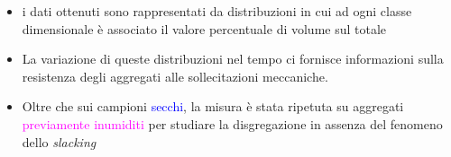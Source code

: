 \documentclass[10pt]{beamer}
\begin{document}
\begin{frame}

  \begin{minipage}[ht]{\textwidth}
    \footnotesize
    \begin{itemize}[<+->]
    \item i dati ottenuti sono rappresentati da distribuzioni in cui ad
      ogni classe dimensionale \`e associato il valore percentuale di
      volume sul totale
      \pause
    \item La variazione di queste distribuzioni nel tempo ci fornisce
      informazioni sulla resistenza degli aggregati alle sollecitazioni
      meccaniche.
    \item Oltre che sui campioni \textcolor{blue}{secchi}, la misura \`e
      stata ripetuta su aggregati \textcolor{magenta}{previamente
        inumiditi} per studiare la disgregazione in assenza del fenomeno
      dello \textit{slacking}
    \end{itemize}
  \end{minipage}
  \begin{minipage}[ht]{\textwidth}
    \centering
  \end{minipage}

\end{frame}
\end{document}
